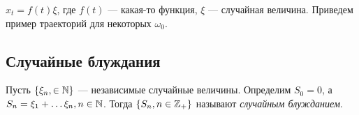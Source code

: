 \begin{example}
  $x_t = f(t) \xi$, где $f(t)$ --- какая-то функция, $\xi$ --- случайная величина.
  Приведем пример траекторий для некоторых $\omega_0$.
  \begin{center}
  \end{center}
\end{example}

\subsection{Случайные блуждания}

\begin{definition}
  Пусть $\{\xi_n, \in \mathbb{N}\}$ --- независимые случайные величины. Определим
  $S_0 = 0$, а $S_n = \xi_1 + \ldots \xi_n, n \in \mathbb{N}$. Тогда $\{S_n, n \in \mathbb{Z}_{+}\}$
  называют \emph{случайным блужданием}.   
\end{definition}

